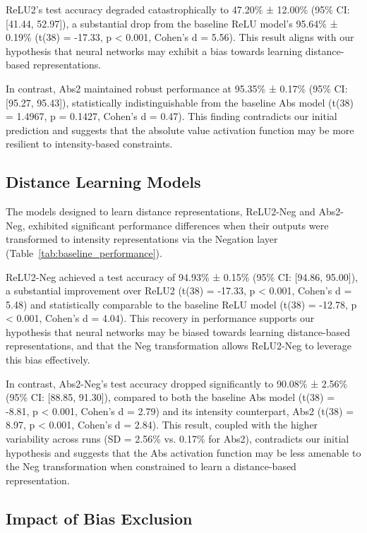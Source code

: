 ReLU2's test accuracy degraded catastrophically to 47.20\% ± 12.00\% (95\% CI: [41.44, 52.97]), a substantial drop from the baseline ReLU model's 95.64\% ± 0.19\% (t(38) = -17.33, p < 0.001, Cohen's d = 5.56). This result aligns with our hypothesis that neural networks may exhibit a bias towards learning distance-based representations. 

In contrast, Abs2 maintained robust performance at 95.35\% ± 0.17\% (95\% CI: [95.27, 95.43]), statistically indistinguishable from the baseline Abs model (t(38) = 1.4967, p = 0.1427, Cohen's d = 0.47). This finding contradicts our initial prediction and suggests that the absolute value activation function may be more resilient to intensity-based constraints.

\subsection{Distance Learning Models}
The models designed to learn distance representations, ReLU2-Neg and Abs2-Neg, exhibited significant performance differences when their outputs were transformed to intensity representations via the Negation layer (Table~\ref{tab:baseline_performance}). 

ReLU2-Neg achieved a test accuracy of 94.93\% ± 0.15\% (95\% CI: [94.86, 95.00]), a substantial improvement over ReLU2 (t(38) = -17.33, p < 0.001, Cohen's d = 5.48) and statistically comparable to the baseline ReLU model (t(38) = -12.78, p < 0.001, Cohen's d = 4.04). This recovery in performance supports our hypothesis that neural networks may be biased towards learning distance-based representations, and that the Neg transformation allows ReLU2-Neg to leverage this bias effectively. 

In contrast, Abs2-Neg's test accuracy dropped significantly to 90.08\% ± 2.56\% (95\% CI: [88.85, 91.30]), compared to both the baseline Abs model (t(38) = -8.81, p < 0.001, Cohen's d = 2.79) and its intensity counterpart, Abs2 (t(38) = 8.97, p < 0.001, Cohen's d = 2.84). This result, coupled with the higher variability across runs (SD = 2.56\% vs. 0.17\% for Abs2), contradicts our initial hypothesis and suggests that the Abs activation function may be less amenable to the Neg transformation when constrained to learn a distance-based representation.

\subsection{Impact of Bias Exclusion}

